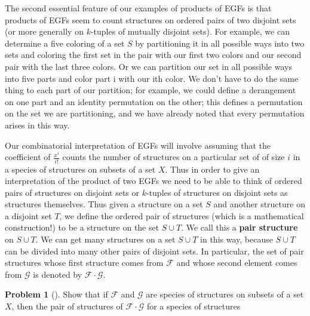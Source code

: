 \documentclass[10pt,]{book}
\newcommand{\terminology}[1]{\textbf{#1}}
\theoremstyle{plain}
\theoremstyle{definition}
\newtheorem{activity}[project]{Problem}
\theoremstyle{definition}
\numberwithin{equation}{chapter}
\newcommand{\F}{\mathcal{F}}
\begin{document}
The second essential feature of our examples of products of EGFs is that products of EGFs seem to count structures on ordered pairs of two disjoint sets (or more generally on \(k\)-tuples of mutually disjoint sets). For example, we can determine a five coloring of a set \(S\) by partitioning it in all possible ways into two sets and coloring the first set in the pair with our first two colors and our second pair with the last three colors. Or we can partition our set in all possible ways into five parts and color part i with our ith color. We don't have to do the same thing to each part of our partition; for example, we could define a derangement on one part and an identity permutation on the other; this defines a permutation on the set we are partitioning, and we have already noted that every permutation arises in this way.%
\par
Our combinatorial interpretation of EGFs will involve assuming that the coefficient of \(\frac{x^i}{i!}\) counts the number of structures on a particular set of of size \(i\) in a species of structures on subsets of a set \(X\).  Thus in order to give an interpretation of the product of two EGFs we need to be able to think of ordered pairs of structures on disjoint sets or \(k\)-tuples of structures on disjoint sets as structures themselves. Thus given a structure on a set \(S\) and another structure on a disjoint set \(T\), we define the ordered pair of structures (which is a mathematical construction!) to be a structure on the set \(S\cup T\). We call this a \terminology{pair structure}   on \(S\cup T\). We can get many structures on a set \(S\cup T\) in this way, because \(S\cup T\) can be divided into many other pairs of disjoint sets. In particular, the set of pair structures whose first structure comes from \(\F\) and whose second element comes from \(\mathcal{G}\) is denoted by \(\F\cdot \mathcal{G}\).%
\begin{activity}[]\marginsymbol[-1em]{} \label{activity-396}
Show that if \(\F\) and \(\mathcal{G}\) are species of structures on subsets of a set \(X\), then the pair of structures of \(\F\cdot\mathcal{G}\) for a species of structures%
\end{activity}
\end{document}
